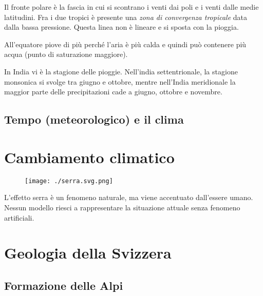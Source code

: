 \documentclass[a4paper]{article}
\begin{document}
Il fronte polare è la fascia in cui si scontrano i venti dai poli e i venti dalle medie latitudini.
Fra i due tropici è presente una \textit{zona di convergenza tropicale} data dalla bassa pressione.
Questa linea non è lineare e si sposta con la pioggia.

All'equatore piove di più perché l'aria è più calda e quindi può contenere più acqua (punto di saturazione maggiore). 

In India vi è la stagione delle pioggie. Nell'india settentrionale,
la stagione monsonica si svolge tra giugno e
ottobre, mentre nell'India meridionale la maggior parte
delle precipitazioni cade a giugno, ottobre e novembre.

\subsection{Tempo (meteorologico) e il clima}


\pagebreak

\section{Cambiamento climatico}


\begin{center}
\begin{figure}[h]
    \centering
    \texttt{[image: ./serra.svg.png]}
\end{figure}
\end{center}

L'effetto serra è un fenomeno naturale, ma viene accentuato dall'essere umano.
Nessun modello riesci a rappresentare la situazione attuale senza fenomeno artificiali.

\pagebreak

\section{Geologia della Svizzera}

\subsection{Formazione delle Alpi}
\end{document}
